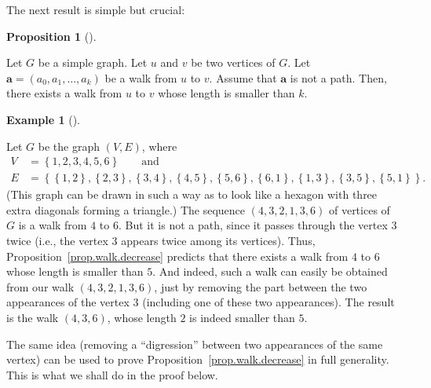 \documentclass[numbers=enddot,12pt,final,onecolumn,notitlepage]{scrartcl}%
\theoremstyle{definition}
\newtheorem{prop}[theo]{Proposition}
\newenvironment{proposition}[1][]
{\begin{prop}[#1]\begin{leftbar}}
{\end{leftbar}\end{prop}}
\newtheorem{exam}[theo]{Example}
\newenvironment{example}[1][]
{\begin{exam}[#1]\begin{leftbar}}
{\end{leftbar}\end{exam}}
\newcommand{\set}[1]{\left\{ #1 \right\}}
\newcommand{\tup}[1]{\left( #1 \right)}
\begin{document}
The next result is simple but crucial:

\begin{proposition} \label{prop.walk.decrease}
Let $G$ be a simple graph. Let $u$ and $v$ be two vertices of $G$.
Let $\mathbf{a} = \tup{a_0, a_1, \ldots, a_k}$ be a walk from $u$ to
$v$.
Assume that $\mathbf{a}$ is not a path. Then, there exists a walk
from $u$ to $v$ whose length is smaller than $k$.
\end{proposition}

\begin{example} \label{exa.walk.decrease}
Let $G$ be the graph $\tup{V, E}$, where
\begin{align*}
V &= \set{1, 2, 3, 4, 5, 6} \qquad \text{and} \\
E &= \set{\set{1,2}, \set{2,3}, \set{3,4}, \set{4,5}, \set{5,6},
          \set{6,1}, \set{1,3}, \set{3,5}, \set{5,1}} .
\end{align*}
(This graph can be drawn in such a way as to look like a hexagon with
three extra diagonals forming a triangle.)
The sequence $\tup{4, 3, 2, 1, 3, 6}$ of vertices of $G$ is a walk
from $4$ to $6$. But it is not a path, since it passes through
the vertex $3$ twice (i.e., the vertex $3$ appears twice among its
vertices). Thus, Proposition~\ref{prop.walk.decrease} predicts that
there exists a walk from $4$ to $6$ whose length is smaller than $5$.
And indeed, such a walk can easily be obtained from our walk
$\tup{4, 3, 2, 1, 3, 6}$, just by removing the part between the two
appearances of the vertex $3$ (including one of these two
appearances). The result is the walk $\tup{4, 3, 6}$, whose length
$2$ is indeed smaller than $5$.

The same idea (removing a ``digression'' between two appearances of
the same vertex) can be used to prove
Proposition~\ref{prop.walk.decrease} in full generality. This is what
we shall do in the proof below.
\end{example}
\end{document}
